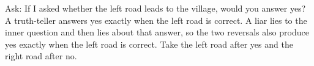 Ask: If I asked whether the left road leads to the village, would you answer yes? A truth-teller answers yes exactly when the left road is correct. A liar lies to the inner question and then lies about that answer, so the two reversals also produce yes exactly when the left road is correct. Take the left road after yes and the right road after no.

